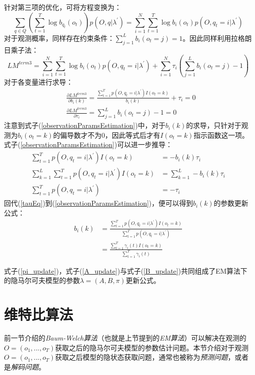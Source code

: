 \documentclass[UTF8, 12pt]{ctexart}
\begin{document}
	针对第三项的优化，可将方程变换为：
	\begin{equation}
		\sum_{q \in Q} (\sum_{t=1}^{T}\log b_{q_{t}}(o_{t}))p(O,q|\lambda^{'}) = \sum_{i=1}^{N} \sum_{t=1}^{T} \log b_{i}(o_{t})p(O, q_{t}=i|\lambda^{'})
	\end{equation}
	对于观测概率，同样存在约束条件：$\sum_{j=1}^{L}{b_{i}(o_{t} = j)}=1$。因此同样利用拉格朗日乘子法：
	\begin{equation}
		LM^{term3} = \sum_{i=1}^{N} \sum_{t=1}^{T} \log b_{i}(o_{t})p(O, q_{t}=i|\lambda^{'}) + \sum_{i=1}^{N} \tau_{i}(\sum_{j=1}^{L}b_{i}(o_{t}=j) - 1)
	\end{equation}
	对于各变量进行求导：
	\begin{align}
		\label{observationParamsEstimation}
		& \frac{\partial LM^{term3}}{\partial b_{i}(k)} = \frac{ \sum_{t=1}^{T} p(O, q_{t}=i|\lambda^{'}) I(o_{t}=k) }{b_{i}(k)} + \tau_{i} = 0 \\
		& \frac{\partial LM^{term3}}{\partial \tau_{i}} = \sum_{j=1}^{L}b_{i}(o_{t}=j) - 1 = 0
	\end{align}
	注意到式子(\ref{observationParamsEstimation})中，对于$b_{i}(k)$的求导，只针对于观测为$b_{i}(o_{t}=k)$的偏导数才不为0，因此等式后才有$I(o_{t}=k)$指示函数这一项\cite{Bilmes1998A}\cite{Tumarkov}。式子(\ref{observationParamsEstimation})可以进一步推导：
	\begin{align}
		\sum_{t=1}^{T} p(O, q_{t}=i|\lambda^{'}) I(o_{t}=k) & = -b_{i}(k) \tau_{i} \\
		\sum_{k=1}^{L} \sum_{t=1}^{T} p(O, q_{t}=i|\lambda^{'}) I(o_{t}=k) & = \sum_{k=1}^{L} -b_{i}(k) \tau_{i} \\
		\label{tauEq}
		\sum_{t=1}^{T} p(O, q_{t}=i|\lambda^{'}) & = -\tau_{i}
	\end{align}
	回代(\ref{tauEq})到(\ref{observationParamsEstimation})，便可以得到$b_{i}(k)$的参数更新公式：
	\begin{align}
		\label{B_update}
		b_{i}(k) & = \frac{\sum_{t=1}^{T} p(O, q_{t}=i|\lambda^{'}) I(o_{t}=k)}{\sum_{t=1}^{T} p(O, q_{t}=i|\lambda^{'})} \\
				 & = \frac{\sum_{t=1}^{T} \gamma_{i}(t)I(o_{t}=k)}{\sum_{t=1}^{T} \gamma_{i}(t)}
	\end{align}
	
	式子(\ref{pi_update})，式子(\ref{A_update})与式子(\ref{B_update})共同组成了EM算法下的隐马尔可夫模型的参数$\lambda=(A,B,\pi)$更新公式。
	
\section{维特比算法}
	前一节介绍的\emph{Baum-Welch算法}（也就是上节提到的\emph{EM算法}）可以解决在观测的$O=(o_{1},...,o_{T})$获取之后的隐马尔可夫模型的参数估计问题。本节介绍对于观测$O=(o_{1},...,o_{T})$获取之后模型的隐状态获取问题，通常也被称为\emph{预测问题}，或者是\emph{解码问题}。
	
\end{document}
